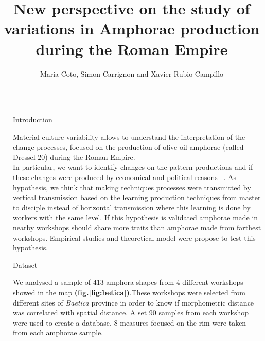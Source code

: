 \documentclass[final]{beamer}
\title{New perspective on the study of variations in Amphorae production during the Roman Empire} %
\author{Maria Coto, Simon Carrignon and Xavier Rubio-Campillo} %
\institute{Barcelona Supercomputing Center - University of Barcelona} %
\newlength{\sepwid}
\newlength{\onecolwid}
\begin{document}

\setlength{\belowcaptionskip}{2ex} %
\setlength\belowdisplayshortskip{2ex} %

\begin{frame}[t] %

\begin{columns}[t] %

\begin{column}{\sepwid}\end{column} %

\begin{column}{\onecolwid} %


\begin{block}{Introduction}

Material culture variability allows to understand the interpretation of the change processes, focused on the production of olive oil amphorae (called Dressel 20) during the Roman Empire. \\
In particular, we want to identify changes on the pattern productions and if these changes were produced by economical and political reasons ~\cite{schillinger}. As
hypothesis, we think that making techniques processes were transmitted by vertical transmission based on the learning production techniques from master to disciple instead of horizontal transmission where this learning is done by workers with the same level. If this hypothesis is validated amphorae made in nearby workshops should share more traits than amphorae made from farthest workshops. Empirical studies and theoretical model were propose to test this hypothesis. 
\end{block}


\begin{block}{Dataset}


    We analysed a sample of 413 amphora shapes from 4 different workshops showed in the map \textbf{(fig.\ref{fig:betica})}.These workshops were selected from different sites of \emph{Baetica} province in order to know if morphometric distance was correlated with spatial distance. A set 90 samples from each workshop were used to create a database. 8 measures focused on the rim were taken from each amphorae sample. 


\end{block}
\end{column}
\end{columns}
\end{frame}
\end{document}
